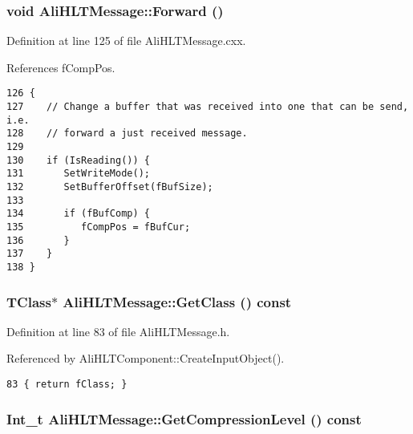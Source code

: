 \subsubsection{\setlength{\rightskip}{0pt plus 5cm}void Ali\-HLTMessage::Forward ()}\label{classAliHLTMessage_a4}




Definition at line 125 of file Ali\-HLTMessage.cxx.

References f\-Comp\-Pos.

\footnotesize\begin{verbatim}126 {
127    // Change a buffer that was received into one that can be send, i.e.
128    // forward a just received message.
129 
130    if (IsReading()) {
131       SetWriteMode();
132       SetBufferOffset(fBufSize);
133 
134       if (fBufComp) {
135          fCompPos = fBufCur;
136       }
137    }
138 }
\end{verbatim}\normalsize 


\subsubsection{\setlength{\rightskip}{0pt plus 5cm}TClass$\ast$ Ali\-HLTMessage::Get\-Class () const\hspace{0.3cm}{\tt  [inline]}}\label{classAliHLTMessage_a5}




Definition at line 83 of file Ali\-HLTMessage.h.

Referenced by Ali\-HLTComponent::Create\-Input\-Object().

\footnotesize\begin{verbatim}83 { return fClass; }
\end{verbatim}\normalsize 


\subsubsection{\setlength{\rightskip}{0pt plus 5cm}Int\_\-t Ali\-HLTMessage::Get\-Compression\-Level () const\hspace{0.3cm}{\tt  [inline]}}\label{classAliHLTMessage_a11}




